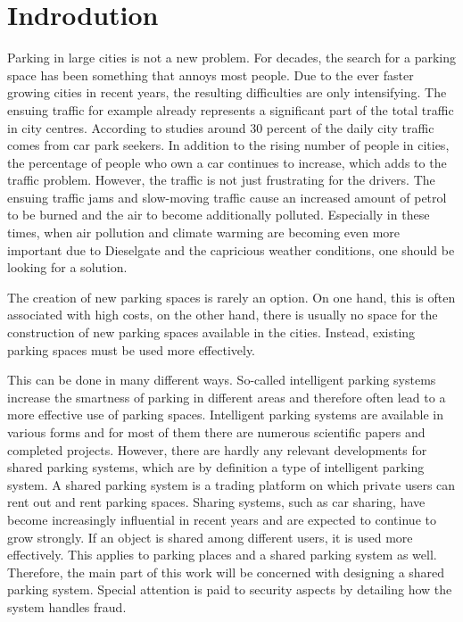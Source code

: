 \documentclass[
a4paper,     %
titlepage,   %
14pt         %
]{scrartcl}  %
\theoremstyle{mystyle}
\begin{document}
\section{Indrodution}

Parking in large cities is not a new problem. For decades, the search for a parking space has been something that annoys most people. Due to the ever faster growing cities in recent years, the resulting difficulties are only intensifying. The ensuing traffic for example already represents a significant part of the total traffic in city centres. According to studies around 30 percent of the daily city traffic comes from car park seekers.\cite{shoup2006cruising} In addition to the rising number of people in cities, the percentage of people who own a car continues to increase, which adds to the traffic problem. However, the traffic is not just frustrating for the drivers. The ensuing traffic jams and slow-moving traffic cause an increased amount of petrol to be burned and the air to become additionally polluted. Especially in these times, when air pollution and climate warming are becoming even more important due to Dieselgate and the capricious weather conditions, one should be looking for a solution.

The creation of new parking spaces is rarely an option. On one hand, this is often associated with high costs, on the other hand, there is usually no space for the construction of new parking spaces available in the cities. Instead, existing parking spaces must be used more effectively.

This can be done in many different ways. So-called intelligent parking systems increase the smartness of parking in different areas and therefore often lead to a more effective use of parking spaces. Intelligent parking systems are available in various forms and for most of them there are numerous scientific papers and completed projects. However, there are hardly any relevant developments for shared parking systems, which are by definition a type of intelligent parking system. A shared parking system is a trading platform on which private users can rent out and rent parking spaces. Sharing systems, such as car sharing, have become increasingly influential in recent years and are expected to continue to grow strongly. If an object is shared among different users, it is used more effectively. This applies to parking places and a shared parking system as well. Therefore, the main part of this work will be concerned with designing a shared parking system. Special attention is paid to security aspects by detailing how the system handles fraud.
\end{document}
